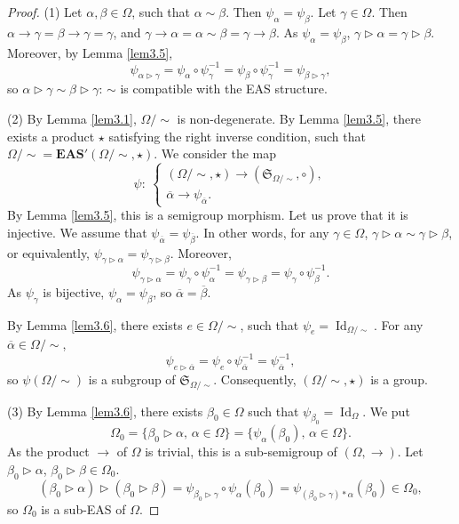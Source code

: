 \documentclass[10pt,a4paper]{amsart}
\numberwithin{equation}{section}
\newcommand{\eas}{\mathbf{EAS}}
\begin{document}
\begin{proof}
(1) Let $\alpha,\beta \in \Omega$, such that $\alpha \sim\beta$. Then $\psi_\alpha=\psi_\beta$. Let $\gamma \in \Omega$. Then $\alpha \rightarrow \gamma=\beta \rightarrow \gamma=\gamma$, and $\gamma \rightarrow \alpha=\alpha \sim \beta=\gamma \rightarrow \beta$.
As $\psi_\alpha=\psi_\beta$, $\gamma \triangleright \alpha=\gamma \triangleright \beta$. Moreover, by Lemma \ref{lem3.5},
\[\psi_{\alpha \triangleright \gamma}=\psi_\alpha \circ \psi_\gamma^{-1}=\psi_\beta\circ \psi_\gamma^{-1}=\psi_{\beta \triangleright \gamma},\]
so $\alpha \triangleright \gamma\sim \beta \triangleright \gamma$: $\sim$ is compatible with the EAS structure.

(2) By Lemma \ref{lem3.1}, $\Omega/{\sim}$ is non-degenerate. By Lemma \ref{lem3.5}, there exists a product $\star$ satisfying the right inverse condition, such that $\Omega/{\sim}=\eas'(\Omega/{\sim},\star)$. We consider the map
\[\psi\colon\ \begin{cases}
(\Omega/{\sim},\star) \longrightarrow (\mathfrak{S}_{\Omega/{\sim}},\circ),\\
\overline{\alpha} \longrightarrow \psi_{\overline{\alpha}}.
\end{cases}\]
By Lemma \ref{lem3.5}, this is a semigroup morphism. Let us prove that it is injective. We assume that $\psi_{\overline{\alpha}}=\psi_{\overline{\beta}}$.
In other words, for any $\gamma \in \Omega$, $\gamma \triangleright \alpha\sim \gamma \triangleright \beta$, or equivalently, $\psi_{\gamma \triangleright \alpha}=\psi_{\gamma \triangleright \beta}$. Moreover,
\[\psi_{\gamma \triangleright \alpha}=\psi_\gamma \circ \psi_\alpha^{-1}=\psi_{\gamma \triangleright \beta}=\psi_\gamma \circ \psi_\beta^{-1}.\]
As $\psi_\gamma$ is bijective, $\psi_\alpha=\psi_\beta$, so $\overline{\alpha}=\overline{\beta}$.

By Lemma \ref{lem3.6}, there exists $e\in \Omega/{\sim}$, such that $\psi_e=\operatorname{Id}_{\Omega/{\sim}}$. For any $\overline{\alpha}\in \Omega/{\sim}$,
\[\psi_{e\triangleright \overline{\alpha}}=\psi_e\circ \psi_{\overline{\alpha}}^{-1}=\psi_{\overline{\alpha}}^{-1},\]
so $\psi(\Omega/{\sim})$ is a subgroup of $\mathfrak{S}_{\Omega/{\sim}}$. Consequently, $(\Omega/{\sim},\star)$ is a group.

(3) By Lemma \ref{lem3.6}, there exists $\beta_0\in \Omega$ such that $\psi_{\beta_0}=\operatorname{Id}_\Omega$. We put
\[\Omega_0=\{\beta_0\triangleright \alpha,\, \alpha \in \Omega\}=\{\psi_\alpha(\beta_0),\, \alpha \in \Omega\}.\]
As the product $\rightarrow$ of $\Omega$ is trivial, this is a sub-semigroup of $(\Omega,\rightarrow)$. Let $\beta_0\triangleright \alpha$, $\beta_0\triangleright \beta \in \Omega_0$.
\[(\beta_0\triangleright \alpha)\triangleright (\beta_0\triangleright \beta)=\psi_{\beta_0\triangleright \gamma}\circ \psi_{\alpha}(\beta_0)=\psi_{(\beta_0\triangleright \gamma)*\alpha}(\beta_0)\in \Omega_0,\]
so $\Omega_0$ is a sub-EAS of $\Omega$.


\end{proof}
\end{document}
